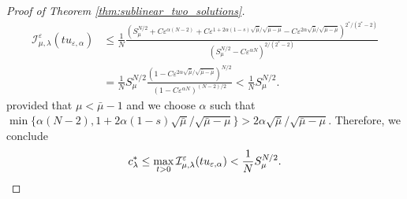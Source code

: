 \documentclass[11pt]{article}
\newcommand{\al} {\alpha}
\newcommand{\ntrl}{\mathbb{N}}
\newcommand{\Ie}{\mathcal{I}_{\mu,\lambda}^{\varepsilon}} %
\begin{document}
\begin{proof}[Proof of Theorem \ref{thm:sublinear_two_solutions}]
\begin{equation*}
\begin{aligned}
\Ie(t u_{\varepsilon,\al}) &\leq \frac{1}{N} \frac{\left( S_{\mu}^{N/2} + C \varepsilon^{\al (N - 2)} + C \varepsilon^{1+2 \al (1-s)\sqrt{\bar{\mu}}/\sqrt{\bar{\mu} - \mu}} - 
 C \varepsilon^{2 \al \sqrt{\bar{\mu}}/\sqrt{\bar{\mu} - \mu}}  \right)^{2^*/(2^*-2)}}{\left(S_{\mu}^{N/2}-C \varepsilon^{\al N}\right)^{2/(2^*-2)}}\\
& = \frac{1}{N} S_{\mu}^{N/2}  \frac{(1 - C\varepsilon^{2 \al \sqrt{\bar{\mu}}/\sqrt{\bar{\mu}-\mu}})^{N/2}}{(1 - C \varepsilon^{\al N})^{(N - 2)/2}} < \frac{1}{N} S_{\mu}^{N/2}.
\end{aligned}
\end{equation*}
provided that \( \mu < \bar{\mu} - 1 \) and we choose $\al$ such that $\min\{\al(N-2), 1+2 \al (1-s)\sqrt{\bar{\mu}}/\sqrt{\bar{\mu} - \mu}\} > 2 \al \sqrt{\bar{\mu}}/\sqrt{\bar{\mu} - \mu}$.
Therefore, we conclude
\begin{equation*} 
c^*_{\lambda} \leq \max_{t > 0} \Ie(t u_{\varepsilon,\al}) < \frac{1}{N} S_{\mu}^{N/2}. \qedhere
\end{equation*}
\end{proof}




\end{document}
